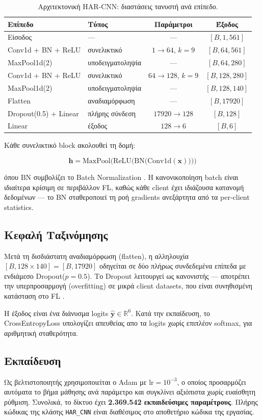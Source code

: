 \begin{table}[h]
\centering
\caption{Αρχιτεκτονική HAR-CNN: διαστάσεις τανυστή ανά επίπεδο.}
\label{tab:cnn_arch}
\begin{tabular}{llcc}
\hline
\textbf{Επίπεδο} & \textbf{Τύπος} & \textbf{Παράμετροι} & \textbf{Έξοδος} \\
\hline
Είσοδος & — & — & $[B, 1, 561]$ \\
Conv1d + BN + ReLU & συνελικτικό & $1{\to}64$, $k{=}9$ & $[B, 64, 561]$ \\
MaxPool1d(2) & υποδειγματοληψία & — & $[B, 64, 280]$ \\
Conv1d + BN + ReLU & συνελικτικό & $64{\to}128$, $k{=}9$ & $[B, 128, 280]$ \\
MaxPool1d(2) & υποδειγματοληψία & — & $[B, 128, 140]$ \\
Flatten & αναδιαμόρφωση & — & $[B, 17920]$ \\
Dropout(0.5) + Linear & πλήρης σύνδεση & $17920{\to}128$ & $[B, 128]$ \\
Linear & έξοδος & $128{\to}6$ & $[B, 6]$ \\
\hline
\end{tabular}
\end{table}

Κάθε συνελικτικό block ακολουθεί τη δομή:

\begin{equation}
\mathbf{h} = \text{MaxPool}\bigl(\text{ReLU}\bigl(\text{BN}\bigl(\text{Conv1d}(\mathbf{x})\bigr)\bigr)\bigr)
\label{eq:conv_block}
\end{equation}

όπου $\text{BN}$ συμβολίζει το Batch Normalization \cite{He2016}. Η κανονικοποίηση batch είναι ιδιαίτερα κρίσιμη σε περιβάλλον FL, καθώς κάθε client έχει ιδιάζουσα κατανομή δεδομένων — το BN σταθεροποιεί τη ροή gradients ανεξάρτητα από τα per-client statistics.

\subsection{Κεφαλή Ταξινόμησης}

Μετά τη δισδιάστατη αναδιαμόρφωση (flatten), η αλληλουχία $[B, 128 \times 140] = [B, 17920]$ οδηγείται σε δύο πλήρως συνδεδεμένα επίπεδα με ενδιάμεσο Dropout($p{=}0.5$). Το Dropout λειτουργεί ως κανονιστής — αποτρέπει την υπερπροσαρμογή (overfitting) σε μικρά client datasets, που είναι συνηθισμένη κατάσταση στο FL \cite{Goodfellow2016}.

Η έξοδος είναι ένα διάνυσμα logits $\hat{\mathbf{y}} \in \mathbb{R}^6$. Κατά την εκπαίδευση, το CrossEntropyLoss υπολογίζει απευθείας απο τα logits χωρίς επιπλέον softmax, για αριθμητική σταθερότητα.

\subsection{Εκπαίδευση}

Ως βελτιστοποιητής χρησιμοποιείται ο Adam \cite{Kingma2015} με $\text{lr} = 10^{-3}$, ο οποίος προσαρμόζει αυτόματα το βήμα μάθησης ανά παράμετρο και συγκλίνει αξιόπιστα χωρίς ευαίσθητη ρύθμιση. Συνολικά, το δίκτυο έχει \textbf{2.369.542 εκπαιδεύσιμες παραμέτρους}. Πλήρης κώδικας της κλάσης \texttt{HAR\_CNN} είναι διαθέσιμος στο αποθετήριο κώδικα της εργασίας.